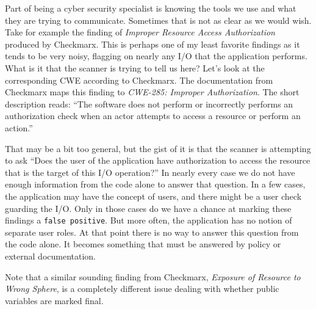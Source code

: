 Part of being a cyber security specialist is knowing the tools we use and what they are trying to communicate. Sometimes that is not as clear as we would wish. Take for example the finding of \textit{Improper Resource Access Authorization} produced by Checkmarx. This is perhaps one of my least favorite findings as it tends to be very noisy, flagging on nearly any I/O that the application performs. What is it that the scanner is trying to tell us here? Let's look at the corresponding CWE according to Checkmarx. The documentation from Checkmarx maps this finding to \textit{CWE-285: Improper Authorization}. The short description reads: ``The software does not perform or incorrectly performs an authorization check when an actor attempts to access a resource or perform an action.'' 

That may be a bit too general, but the gist of it is that the scanner is attempting to ask ``Does the user of the application have authorization to access the resource that is the target of this I/O operation?'' In nearly every case we do not have enough information from the code alone to answer that question. In a few cases, the application may have the concept of users, and there might be a user check guarding the I/O. Only in those cases do we have a chance at marking these findings a \texttt{false positive}. But more often, the application has no notion of separate user roles. At that point there is no way to answer this question from the code alone. It becomes something that must be answered by policy or external documentation.

Note that a similar sounding finding from Checkmarx, \textit{Exposure of Resource to Wrong Sphere}, is a completely different issue dealing with whether public variables are marked final.
